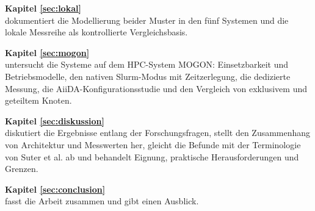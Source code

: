 \textbf{Kapitel \ref{sec:lokal}} \\[0.2em]
dokumentiert die Modellierung beider Muster in den fünf Systemen und
die lokale Messreihe als kontrollierte Vergleichsbasis.

\textbf{Kapitel \ref{sec:mogon}} \\[0.2em]
untersucht die Systeme auf dem HPC-System MOGON: Einsetzbarkeit und
Betriebsmodelle, den nativen Slurm-Modus mit Zeitzerlegung, die
dedizierte Messung, die AiiDA-Konfigurationsstudie und den Vergleich
von exklusivem und geteiltem Knoten.

\textbf{Kapitel \ref{sec:diskussion}} \\[0.2em]
diskutiert die Ergebnisse entlang der Forschungsfragen, stellt den
Zusammenhang von Architektur und Messwerten her, gleicht die Befunde
mit der Terminologie von Suter et al. ab und behandelt Eignung,
praktische Herausforderungen und Grenzen.

\textbf{Kapitel \ref{sec:conclusion}} \\[0.2em]
fasst die Arbeit zusammen und gibt einen Ausblick.
